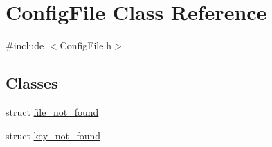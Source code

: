 \hypertarget{classConfigFile}{
\section{ConfigFile Class Reference}
\label{classConfigFile}
}


{\ttfamily \#include $<$ConfigFile.h$>$}

\subsection*{Classes}
\begin{DoxyCompactItemize}
\item 
struct \hyperlink{structConfigFile_1_1file__not__found}{file\_\-not\_\-found}
\item 
struct \hyperlink{structConfigFile_1_1key__not__found}{key\_\-not\_\-found}
\end{DoxyCompactItemize}
